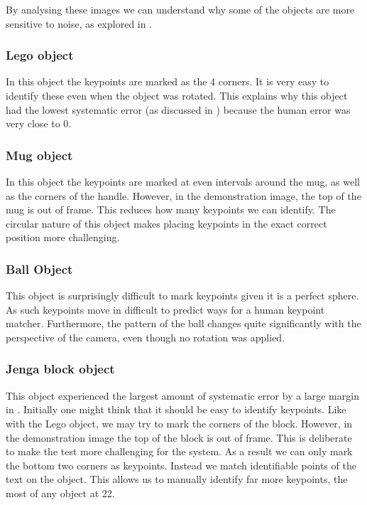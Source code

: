 By analysing these images we can understand why some of the objects are more sensitive to noise, as explored in .

\subsubsection{Lego object}
In this object the keypoints are marked as the 4 corners. It is very easy to identify these even when the object was rotated. This explains why this object had the lowest systematic error (as discussed in ) because the human error was very close to 0.\
\subsubsection{Mug object}
In this object the keypoints are marked at even intervals around the mug, as well as the corners of the handle. However, in the demonstration image, the top of the mug is out of frame. This reduces how many keypoints we can identify. The circular nature of this object makes placing keypoints in the exact correct position more challenging.

\subsubsection{Ball Object}
This object is surprisingly difficult to mark keypoints given it is a perfect sphere. As such keypoints move in difficult to predict ways for a human keypoint matcher. Furthermore, the pattern of the ball changes quite significantly with the perspective of the camera, even though no rotation was applied.

\subsubsection{Jenga block object}
This object experienced the largest amount of systematic error by a large margin in . Initially one might think that it should be easy to identify keypoints. Like with the Lego object, we may try to mark the corners of the block. However, in the demonstration image the top of the block is out of frame. This is deliberate to make the test more challenging for the system. As a result we can only mark the bottom two corners as keypoints. Instead we match identifiable points of the text on the object. This allows us to manually identify far more keypoints, the most of any object at 22.

